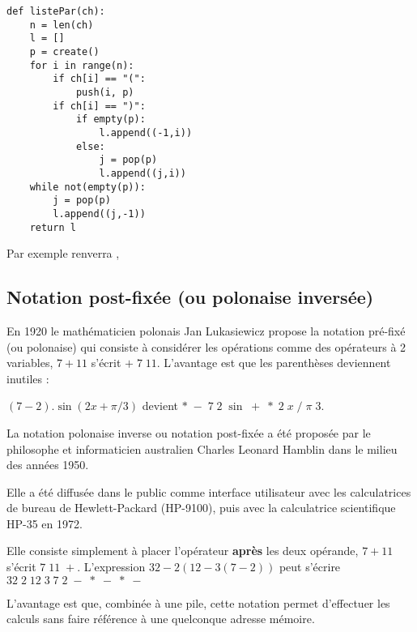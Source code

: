 \begin{Answer}
\begin{lstlisting}
def listePar(ch):
    n = len(ch)
    l = []
    p = create()
    for i in range(n):
        if ch[i] == "(":
            push(i, p)
        if ch[i] == ")":
            if empty(p):
                l.append((-1,i))
            else:
                j = pop(p)
                l.append((j,i))
    while not(empty(p)):
        j = pop(p)
        l.append((j,-1))
    return l
\end{lstlisting}
\end{Answer}
Par exemple  renverra \type{[(0, 4), (-1, 5), (9, 12), (8, -1)]},
\subsection{Notation post-fixée (ou polonaise inversée)}\label{app:npi}
En 1920 le mathématicien polonais Jan Lukasiewicz propose la notation pré-fixé (ou polonaise) qui consiste à considérer les opérations comme des opérateurs à 2 variables, $7 + 11$ s'écrit $+\; 7\; 11$. L'avantage est que les parenthèses deviennent inutiles :

 $(7-2).\sin(2x+\pi/3)$ devient
$*\; -\; 7\; 2\; \sin\; +\; *\; 2\; x\; /\; \pi\; 3$.

La notation polonaise inverse ou notation post-fixée a été proposée par le philosophe et informaticien australien Charles Leonard Hamblin  dans le milieu des années 1950. 

Elle a été diffusée dans le public comme interface utilisateur avec les calculatrices de bureau de Hewlett-Packard (HP-9100), puis avec la calculatrice scientifique HP-35 en 1972.

Elle consiste simplement à placer l'opérateur {\bf après} les deux opérande, $7 + 11$ s'écrit $7\; 11\; +$. L'expression $32 - 2 (12 - 3 (7 - 2))$ peut s'écrire
$32\;  2\;  12\;  3\;  7\;  2\;  -\;   *\;  -\;  *\;  -$

L'avantage est que, combinée à une pile, cette notation permet d'effectuer les calculs sans faire référence à une quelconque adresse mémoire. 

